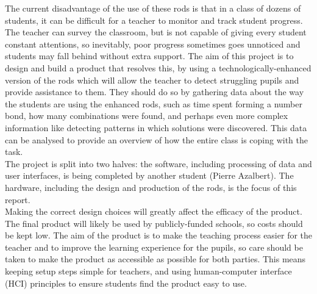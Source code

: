 The current disadvantage of the use of these rods is that in a class of dozens of students, it can be difficult for a teacher to monitor and track student progress. The teacher can survey the classroom, but is not capable of giving every student constant attentions, so inevitably, poor progress sometimes goes unnoticed and students may fall behind without extra support. The aim of this project is to design and build a product that resolves this, by using a technologically-enhanced version of the rods which will allow the teacher to detect struggling pupils and provide assistance to them. They should do so by gathering data about the way the students are using the enhanced rods, such as time spent forming a number bond, how many combinations were found, and perhaps even more complex information like detecting patterns in which solutions were discovered. This data can be analysed to provide an overview of how the entire class is coping with the task.\\

The project is split into two halves: the software, including processing of data and user interfaces, is being completed by another student (Pierre Azalbert). The hardware, including the design and production of the rods, is the focus of this report.\\

Making the correct design choices will greatly affect the efficacy of the product. The final product will likely be used by publicly-funded schools, so costs should be kept low. The aim of the product is to make the teaching process easier for the teacher and to improve the learning experience for the pupils, so care should be taken to make the product as accessible as possible for both parties. This means keeping setup steps simple for teachers, and using human-computer interface (HCI) principles to ensure students find the product easy to use.

